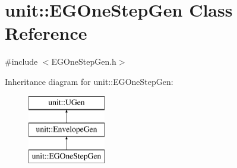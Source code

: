 \hypertarget{classunit_1_1EGOneStepGen}{\section{unit\-:\-:E\-G\-One\-Step\-Gen Class Reference}
\label{classunit_1_1EGOneStepGen}
}


{\ttfamily \#include $<$E\-G\-One\-Step\-Gen.\-h$>$}

Inheritance diagram for unit\-:\-:E\-G\-One\-Step\-Gen\-:\begin{figure}[H]
\begin{center}
\leavevmode
\includegraphics[height=3.000000cm]{classunit_1_1EGOneStepGen}
\end{center}
\end{figure}
